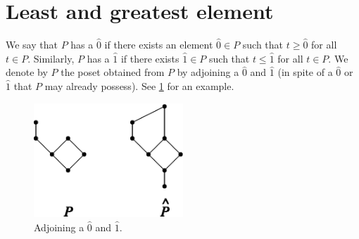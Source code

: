 \section{Least and greatest element}

We say that $P$ has a $\hat{0}$ if there exists an element $\hat{0} \in P$ such that $t \geq \hat{0}$ for all $t \in P$. Similarly, $P$ has a $\hat{1}$ if there exists $\hat{1} \in P$ such that $t \leq \hat{1}$ for all $t \in P$. We denote by $P$ the poset obtained from $P$ by adjoining a $\hat{0}$ and $\hat{1}$ (in spite of a $\hat{0}$ or $\hat{1}$ that $P$ may already possess). See \ref{fig:stanley:3-3} for an example. \cite{Stanley:2011:ECV:2124415}



\begin{figure}
	\centering
	\includegraphics[width=0.5\textwidth]{fig/stanley/3-3}
	\caption{\label{fig:stanley:3-3} Adjoining a $\hat{0}$ and $\hat{1}$. \cite{Stanley:2011:ECV:2124415}}
\end{figure}
